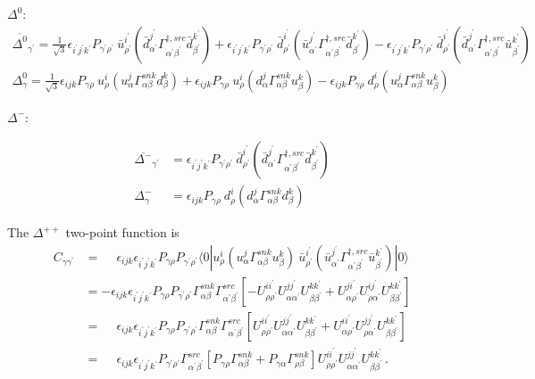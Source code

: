 \documentclass[prd,12pt,superscriptaddress,tightenlines,nofootinbib]{revtex4}
\def\a{{\alpha}}
\def\b{{\beta}}
\def\g{{\gamma}}
\def\G{{\Gamma}}
\def\ip{{i^\prime}}
\def\jp{{j^\prime}}
\def\kp{{k^\prime}}
\def\ap{{\alpha^\prime}}
\def\bp{{\beta^\prime}}
\def\gp{{\gamma^\prime}}
\def\rp{{\rho^\prime}}
\begin{document}
$\Delta^{0}$: 
	\begin{gather}
		\overline{\Delta^{0}}_{\gp} =  \frac{1}{\sqrt{3}}\epsilon_{\ip\jp\kp} P_{\gp\rp}\ \bar{u}^\ip_\rp (\bar{d}^{\jp}_{\ap} \G^{\dagger,src}_{\ap\bp} \bar{d}^\kp_\bp ) 
		+ \epsilon_{\ip\jp\kp} P_{\gp\rp}\ \bar{d}^\ip_\rp (\bar{u}^{\jp}_{\ap} \G^{\dagger,src}_{\ap\bp} \bar{d}^\kp_\bp ) -
		\epsilon_{\ip\jp\kp} P_{\gp\rp}\ \bar{d}^\ip_\rp (\bar{d}^{\jp}_{\ap} \G^{\dagger,src}_{\ap\bp} \bar{u}^\kp_\bp ) 
		\\
		\Delta^{0}_{\g} = \frac{1}{\sqrt{3}}\epsilon_{ijk} P_{\g\rho}\ u^i_\rho (u^j_\a \G^{snk}_{\a\b} d^k_\b ) +  \epsilon_{ijk} P_{\g\rho}\ u^i_\rho (d^j_\a \G^{snk}_{\a\b} u^k_\b ) - 
		\epsilon_{ijk} P_{\g\rho}\ d^i_\rho (u^j_\a \G^{snk}_{\a\b} u^k_\b ) 
	\end{gather}

$\Delta^{-}$: 

\begin{align}
	\overline{\Delta^{-}}_{\gp} &= \epsilon_{\ip\jp\kp} P_{\gp\rp}\ \bar{d}^\ip_\rp (\bar{d}^{\jp}_{\ap} \G^{\dagger,src}_{\ap\bp} \bar{d}^\kp_\bp ) 
	\\
	\Delta^{-}_{\g} &= \epsilon_{ijk} P_{\g\rho}\ d^i_\rho (d^j_\a \G^{snk}_{\a\b} d^k_\b ) 
\end{align}


The $\Delta^{++}$ two-point function is
\begin{align}
C_{\g\gp} &= \phantom{-}\epsilon_{ijk} \epsilon_{\ip\jp\kp} P_{\g\rho} P_{\gp\rp} \langle 0| 
	u^i_\rho (u^j_\a \G^{snk}_{\a\b} u^k_\b ) \ \bar{u}^\ip_\rp (\bar{u}^{\jp}_{\ap} \G^{\dagger,src}_{\ap\bp} \bar{u}^\kp_\bp ) 
	|0\rangle
\nonumber\\ &=
	-\epsilon_{ijk} \epsilon_{\ip\jp\kp} P_{\g\rho} P_{\gp\rp} \G^{snk}_{\a\b} \G^{src}_{\ap\bp}
	\left[ -U^{i\ip}_{\rho\rp} U^{j\jp}_{\a\ap} U^{k\kp}_{\b\bp} 
		+ U^{j\ip}_{\a\rp} U^{i\jp}_{\rho\ap} U^{k\kp}_{\b\bp} 
	\right]
\nonumber\\ &=
	\phantom{-}\epsilon_{ijk} \epsilon_{\ip\jp\kp} P_{\g\rho} P_{\gp\rp} \G^{snk}_{\a\b} \G^{src}_{\ap\bp} 
	\left[
		U^{i\ip}_{\rho\rp} U^{j\jp}_{\a\ap} U^{k\kp}_{\b\bp} 
		+U^{i\ip}_{\a\rp} U^{j\jp}_{\rho\ap} U^{k\kp}_{\b\bp} 
	\right]
\nonumber\\ &=
	\phantom{-}\epsilon_{ijk} \epsilon_{\ip\jp\kp}  P_{\gp\rp}  \G^{src}_{\ap\bp} 
	\left[
		P_{\g\rho} \G^{snk}_{\a\b} + P_{\g\a} \G^{snk}_{\rho\b}
	\right]
	U^{i\ip}_{\rho\rp} U^{j\jp}_{\a\ap} U^{k\kp}_{\b\bp} \, .
\end{align}
\end{document}
